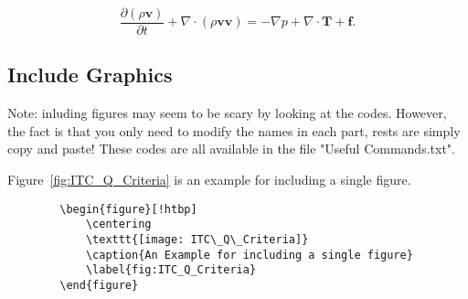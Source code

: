\begin{equation}\label{eq:N-S_equation}
    \frac{\partial (\rho\mathbf{v})}{\partial t} + \nabla \cdot (\rho \mathbf{v} \mathbf{v}) = -\nabla p + \nabla \cdot\mathbf{T} + \mathbf{f}. 
\end{equation}    

\subsection{Include Graphics} %
Note: inluding figures may seem to be scary by looking at the codes. However, the fact is that you only need to modify the names in each part, rests are simply copy and paste! These codes are all available in the file "Useful Commands.txt".

Figure~\ref{fig:ITC_Q_Criteria} is an example for including a single figure.
\begin{center}
    \small
    \begin{verbatim}
        \begin{figure}[!htbp]
            \centering
            \texttt{[image: ITC\_Q\_Criteria]}
            \caption{An Example for including a single figure}
            \label{fig:ITC_Q_Criteria}
        \end{figure}
    \end{verbatim}
\end{center}

